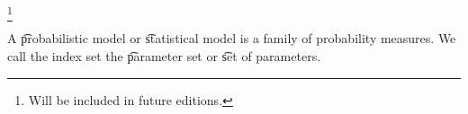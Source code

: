 
\footnote{Will be included in future editions.}


A \t{probabilistic model} or \t{statistical model} is a family of probability measures.
We call the index set the \t{parameter set} or \t{set of parameters}.



\blankpage
